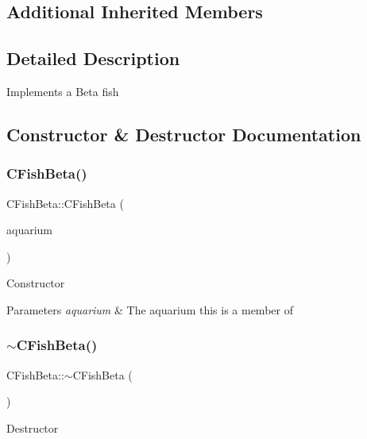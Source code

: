 \subsection*{Additional Inherited Members}


\subsection{Detailed Description}
Implements a Beta fish 

\subsection{Constructor \& Destructor Documentation}
\mbox{\label{class_c_fish_beta_a021073e2e0034271cd7e776b1e3fed29}} 
\subsubsection{\texorpdfstring{C\+Fish\+Beta()}{CFishBeta()}}
{\footnotesize\ttfamily C\+Fish\+Beta\+::\+C\+Fish\+Beta (\begin{DoxyParamCaption}\item[{\mbox{\hyperlink{class_c_aquarium}{C\+Aquarium}} $\ast$}]{aquarium }\end{DoxyParamCaption})}

Constructor 
\begin{DoxyParams}{Parameters}
{\em aquarium} & The aquarium this is a member of \\
\hline
\end{DoxyParams}
\mbox{\label{class_c_fish_beta_abd932894ad25a70f03c79c4f0f00fff4}} 
\subsubsection{\texorpdfstring{$\sim$\+C\+Fish\+Beta()}{~CFishBeta()}}
{\footnotesize\ttfamily C\+Fish\+Beta\+::$\sim$\+C\+Fish\+Beta (\begin{DoxyParamCaption}{ }\end{DoxyParamCaption})}

Destructor 

